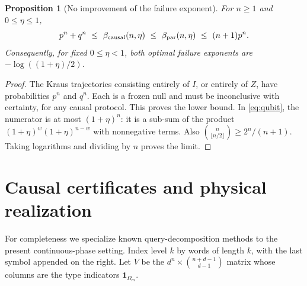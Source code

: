 \documentclass[11pt,a4paper]{article}
\newtheorem{proposition}[theorem]{Proposition}
\theoremstyle{remark}
\begin{document}
\begin{proposition}[No improvement of the failure exponent]\label{prop:exp}
For \(n\geq1\) and \(0\leq\eta\leq1\),
\begin{equation}\label{eq:expbounds}
 p^n+q^n\ \leq\ \beta_{\rm causal}(n,\eta)
 \ \leq\ \beta_{\rm par}(n,\eta)\ \leq\ (n+1)p^n.
\end{equation}
Consequently, for fixed \(0\leq\eta<1\), both optimal failure exponents
are \(-\log((1+\eta)/2)\).
\end{proposition}
\begin{proof}
The Kraus trajectories consisting entirely of \(I\), or entirely of
\(Z\), have probabilities \(p^n\) and \(q^n\). Each is a frozen null and
must be inconclusive with certainty, for any causal protocol.
This proves the lower bound. In \eqref{eq:qubit}, the numerator is at most
\((1+\eta)^n\): it is a sub-sum of the product
\((1+\eta)^w(1+\eta)^{n-w}\) with nonnegative terms.
Also \(\binom n{\lfloor n/2\rfloor}\geq2^n/(n+1)\).
Taking logarithms and dividing by \(n\) proves the limit.
\end{proof}

\section{Causal certificates and physical realization}

For completeness we specialize known query-decomposition methods
\cite{grillo,barnum,combs} to the present continuous-phase setting.
Index level \(k\) by words of length \(k\), with the last symbol appended
on the right. Let \(V\) be the \(d^n\times\binom{n+d-1}{d-1}\) matrix whose
columns are the type indicators \(\mathbf1_{\Omega_m}\).
\end{document}
